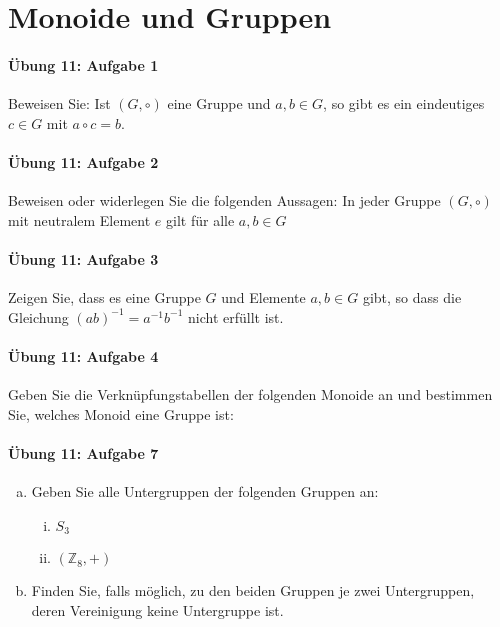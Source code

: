 \documentclass
[
  draft    = true,
  fontsize = 11pt,
  parskip  = half-,
  BCOR     = 0pt,
  DIV      = 11,
  ngerman,
  dvipsnames
]
{scrartcl}
\begin{document}
\section{Monoide und Gruppen}

\paragraph{Übung 11: Aufgabe 1}
Beweisen Sie: Ist $(G,\circ)$ eine Gruppe und $a,b\in G$, so gibt es ein
eindeutiges $c\in G$ mit $a\circ c=b$.

\paragraph{Übung 11: Aufgabe 2}
Beweisen oder widerlegen Sie die folgenden Aussagen: In jeder Gruppe
$(G,\circ)$ mit neutralem Element $e$ gilt für alle $a,b\in G$

\paragraph{Übung 11: Aufgabe 3}
Zeigen Sie, dass es eine Gruppe $G$ und Elemente $a,b\in G$ gibt, so
dass die Gleichung $(ab)^{-1}=a^{-1}b^{-1}$ nicht erfüllt ist.

\paragraph{Übung 11: Aufgabe 4}
Geben Sie die Verknüpfungstabellen der folgenden Monoide an und bestimmen
Sie, welches Monoid eine Gruppe ist:

\paragraph{Übung 11: Aufgabe 7}
\begin{enumerate}[a)]
  \item Geben Sie alle Untergruppen der folgenden Gruppen an:
        \begin{enumerate}[i)]
          \item $S_3$
          \item $(\mathbb{Z}_8,+)$
        \end{enumerate}
  \item Finden Sie, falls möglich, zu den beiden Gruppen je zwei
        Untergruppen, deren Vereinigung keine Untergruppe ist.
\end{enumerate}
\end{document}
